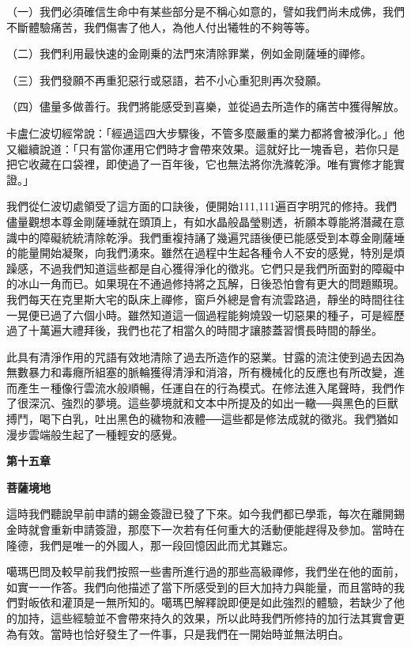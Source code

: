 （一）我們必須確信生命中有某些部分是不稱心如意的，譬如我們尚未成佛，我們不斷體驗痛苦，我們傷害了他人，為他人付出犧牲的不夠等等。

（二）我們利用最快速的金剛乗的法門來清除罪業，例如金剛薩埵的禪修。

（三）我們發願不再重犯惡行或惡語，若不小心重犯則再次發願。

（四）儘量多做善行。我們將能感受到喜樂，並從過去所造作的痛苦中獲得解放。

卡盧仁波切經常說：「經過這四大步驟後，不管多麼嚴重的業力都將會被淨化。」他又繼續說道：「只有當你運用它們時才會帶來效果。這就好比一塊香皂，若你只是把它收藏在口袋裡，即使過了一百年後，它也無法將你洗滌乾淨。唯有實修才能實證。」

我們從仁波切處領受了這方面的口訣後，便開始111,111遍百字明咒的修持。我們儘量觀想本尊金剛薩埵就在頭頂上，有如水晶般晶瑩剔透，祈願本尊能將潛藏在意識中的障礙統統清除乾淨。我們重複持誦了幾遍咒語後便已能感受到本尊金剛薩埵的能量開始凝聚，向我們湧來。雖然在過程中生起各種令人不安的感覺，特別是煩躁感，不過我們知道這些都是自心獲得淨化的徵兆。它們只是我們所面對的障礙中的冰山一角而已。如果現在不通過修持將之瓦解，日後恐怕會有更大的問題顯現。我們每天在克里斯大宅的臥床上禪修，窗戶外總是會有流雲路過，靜坐的時間往往一晃便已過了六個小時。雖然知道這一個過程能夠燒毀一切惡果的種子，可是經歷過了十萬遍大禮拜後，我們也花了相當久的時間才讓膝蓋習慣長時間的靜坐。

此具有清淨作用的咒語有效地清除了過去所造作的惡業。甘露的流注使到過去因為無數暴力和毒癮所組塞的脈輪獲得清淨和消溶，所有機械化的反應也有所改變，進而產生ㄧ種像行雲流水般順暢，任運自在的行為模式。在修法進入尾聲時，我們作了很深沉、強烈的夢境。這些夢境就和文本中所提及的如出一轍──與黑色的巨獸搏鬥，喝下白乳，吐出黑色的穢物和液體──這些都是修法成就的徵兆。我們猶如漫步雲端般生起了一種輕安的感覺。

\textbf{第十五章}

\textbf{菩薩境地}

這時我們聽說早前申請的錫金簽證已發了下來。如今我們都已學乖，每次在離開錫金時就會重新申請簽證，那麼下一次若有任何重大的活動便能趕得及參加。當時在隆德，我們是唯一的外國人，那一段回憶因此而尤其難忘。

噶瑪巴問及較早前我們按照一些書所進行過的那些高級禪修，我們坐在他的面前，如實一一作答。我們向他描述了當下所感受到的巨大加持力與能量，而且當時的我們對皈依和灌頂是一無所知的。噶瑪巴解釋說即便是如此強烈的體驗，若缺少了他的加持，這些經驗並不會帶來持久的效果，所以此時我們所修持的加行法其實會更為有效。當時也恰好發生了一件事，只是我們在一開始時並無法明白。

